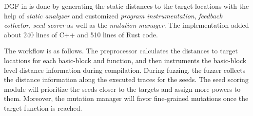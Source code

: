 DGF in {\FOT} is done by generating the static distances to the target locations with the help of \emph{static analyzer} and customized \emph{program instrumentation}, \emph{feedback collector}, \emph{seed scorer} as well as the \emph{mutation manager}. The implementation added about 240 lines of C++ and 510 lines of Rust code.

The workflow is as follows.
The preprocessor calculates the distances to target locations for each basic-block and function, and then instruments the basic-block level distance information during compilation.
During fuzzing, the fuzzer collects the distance information along the executed traces for the seeds.
The seed scoring module will prioritize the seeds closer to the targets and assign more powers to them. 
Moreover, the mutation manager will favor fine-grained mutations once the target function is reached.





